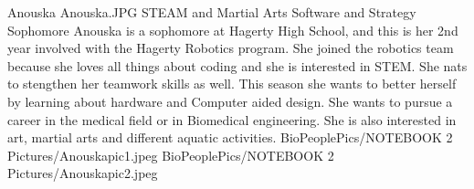 \insertbio
{Anouska}
{Anouska.JPG}
{STEAM and Martial Arts}
{Software and Strategy}
{Sophomore}
{
Anouska is a sophomore at Hagerty High School, and this is her 2nd year involved with the Hagerty Robotics program. She joined the robotics team because she loves all things about coding and she is interested in STEM. She nats to stengthen her teamwork skills as well. This season she wants to better herself by learning about hardware and Computer aided design. She wants to pursue a career in the medical field or in Biomedical engineering. She is also interested in art, martial arts and different aquatic activities. 
}
{BioPeoplePics/NOTEBOOK 2 Pictures/Anouskapic1.jpeg}
{BioPeoplePics/NOTEBOOK 2 Pictures/Anouskapic2.jpeg}
